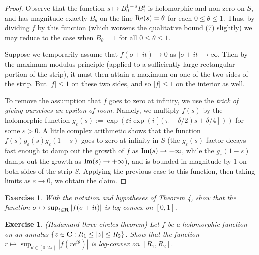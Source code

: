 \documentclass[10pt,reqno]{amsart}
\newtheorem{exercise}[theorem]{Exercise}
\begin{document}
\begin{proof}
    Observe that the function $s \mapsto B_0^{1-s} B_1^s$ is holomorphic and non-zero on $S$, and has magnitude exactly $B_\theta$ on the line $\hbox{Re}(s)=\theta$ for each $0 \leq \theta \leq 1$. Thus, by dividing $f$ by this function (which worsens the qualitative bound (7) slightly) we may reduce to the case when $B_\theta = 1$ for all $0 \leq \theta \leq 1$.

    Suppose we temporarily assume that $f(\sigma+it) \rightarrow 0$ as $|\sigma+it| \rightarrow \infty$. Then by the maximum modulus principle (applied to a sufficiently large rectangular portion of the strip), it must then attain a maximum on one of the two sides of the strip. But $|f| \leq 1$ on these two sides, and so $|f| \leq 1$ on the interior as well.

    To remove the assumption that $f$ goes to zero at infinity, we use the \emph{trick of giving ourselves an epsilon of room}. Namely, we multiply $f(s)$ by the holomorphic function $g_\varepsilon(s) := \exp( \varepsilon i \exp(i[(\pi-\delta/2) s + \delta/4]) )$ for some $\varepsilon > 0$. A little complex arithmetic shows that the function $f(s) g_\varepsilon(s) g_\varepsilon(1-s)$ goes to zero at infinity in $S$ (the $g_\varepsilon(s)$ factor decays fast enough to damp out the growth of $f$ as $\hbox{Im}(s) \rightarrow -\infty$, while the $g_\varepsilon(1-s)$ damps out the growth as $\hbox{Im}(s) \rightarrow +\infty$), and is bounded in magnitude by $1$ on both sides of the strip $S$. Applying the previous case to this function, then taking limits as $\varepsilon \rightarrow 0$, we obtain the claim.
\end{proof}

\begin{exercise}
    With the notation and hypotheses of Theorem 4, show that the function $\sigma \mapsto \sup_{t \in {\bf R}} |f(\sigma+it)|$ is log-convex on $[0,1]$. 
\end{exercise}

\begin{exercise}
    (Hadamard three-circles theorem) Let $f$ be a holomorphic function on an annulus $\{ z \in {\bf C}: R_1 \leq |z| \leq R_2 \}$. Show that the function $r \mapsto \sup_{\theta \in [0,2\pi]} |f(re^{i\theta})|$ is log-convex on $[R_1,R_2]$. 
\end{exercise}
\end{document}
